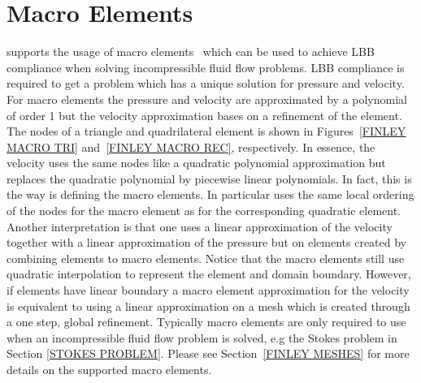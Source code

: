 \section{Macro Elements}
\label{SEC FINLEY MACRO}
\finley supports the usage of macro elements~ which can be used to
achieve LBB compliance when solving incompressible fluid flow problems. LBB compliance is required to
get a problem which has a unique solution for pressure and velocity. For macro elements the
pressure and velocity are approximated by a polynomial of order 1 but the velocity approximation bases on a refinement of the element. The nodes of a triangle and quadrilateral element is shown in Figures~\ref{FINLEY MACRO TRI} and~\ref{FINLEY MACRO REC}, respectively. In essence, the velocity uses the same nodes like a quadratic polynomial approximation but replaces the quadratic polynomial by piecewise linear polynomials. In fact, this is the
way \finley is defining the macro elements. In particular \finley uses the same local ordering of the nodes for the macro element as for the corresponding quadratic element. Another interpretation is that
one uses a linear approximation of the velocity together with a linear approximation of the pressure but on elements
created by combining elements to macro elements. Notice that the macro elements still use quadratic interpolation to represent the element and domain boundary. However, if elements have linear boundary
a macro element approximation for the velocity is equivalent to using a linear approximation on a mesh which is created through a one step, global refinement.
Typically macro elements are only required to use when an incompressible fluid flow problem
is solved, e.g the Stokes problem in Section \ref{STOKES PROBLEM}. Please see Section~\ref{FINLEY MESHES} for
more details on the supported macro elements.



